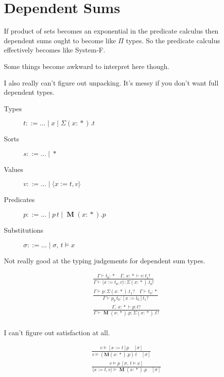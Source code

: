 \documentclass[twocolumn, fleqn]{scrartcl}
\newcommand{\bnfdef}{\mathbin{::=}}
\DeclareMathOperator{\prop}{*}
\DeclareMathOperator{\Mu}{\textbf{M}}
\DeclareMathOperator{\update}{:=}
\begin{document}
\section*{Dependent Sums}

If product of sets becomes an exponential in the predicate calculus
then dependent sums ought to become like \(\Pi\) types.  So the
predicate calculus effectively becomes like System-F.

Some things become awkward to interpret here though.

I also really can't figure out unpacking. It's messy if you don't want
full dependent types.

\begin{description}
\item[Types] \( t \bnfdef \ldots \mid x \mid \Sigma (x \colon \prop). t \)
\item[Sorts] \( s \bnfdef \ldots \mid \prop \)
\item[Values] \( v \bnfdef \ldots \mid \langle x \update t , v \rangle \)
\item[Predicates] \( p \bnfdef \ldots \mid p \, t \mid \Mu (x \colon \prop). p \)
\item[Substitutions] \( \sigma \bnfdef \ldots \mid \sigma , \, t \models x \)
\end{description}

Not really good at the typing judgements for dependent sum types.

\begin{multline*}
\frac{
  \Gamma \vdash t_0 \colon \prop \quad
  \Gamma , \, x \colon \prop \vdash v \colon t_1 !
}{
  \Gamma \vdash \langle x \update t_0 , v \rangle \colon \Sigma (x \colon \prop). t_0 !
}\\
\frac{
  \Gamma \vdash p \colon \Sigma (x\colon \prop). t_1 ? \quad
  \Gamma \vdash t_0 \colon \prop
}{
  \Gamma \vdash p_0 \, t_0 \colon [x \update t_0] t_1 ?
}\\
\frac{
  \Gamma , \, x \colon \prop \vdash p \colon t ?
}{
  \Gamma \vdash \Mu (x \colon \prop). p \colon \Sigma (x\colon \prop). t ?
}\\
\end{multline*}

I can't figure out satisfaction at all.

\begin{multline*}
\frac{
  v \models [x \update t] p \quad [\sigma]
}{
  v \models ( \textbf{M} (x \colon \prop). p) \, t \quad [\sigma]
}\\
\frac{
  v \models p \; [ \sigma , \, t \models x]
}{
  \langle x \update t , v \rangle \models \Mu (x \colon \prop). p \quad [\sigma]
}\\
\end{multline*}
\end{document}
